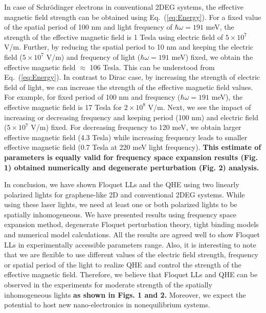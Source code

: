 In case of Schr\"{o}dinger electrons in conventional 2DEG systems, the effective magnetic field strength can be obtained using Eq.~(\ref{eq:Energy}).
For a fixed value of the spatial period of 100 nm and light frequency of $\hbar \omega = 191$ meV, the strength of the effective magnetic field is 1 Tesla using electric field of $5 \times 10^7$ V/m.
Further, by reducing the spatial period to 10 nm and keeping the electric field ($5 \times 10^7$ V/m) and frequency of light ($\hbar \omega = 191 $ meV) fixed, we obtain the effective magnetic field $\approx$ 106 Tesla.
This can be understood from Eq.~(\ref{eq:Energy}).
In contrast to Dirac case, by increasing the strength of electric field of light, we can increase the strength of the effective magnetic field values.
For example, for fixed period of 100 nm and frequency ($\hbar \omega = 191 $ meV), the effective magnetic field is 17 Tesla for $2 \times 10^8$ V/m.
Next, we see the impact of increasing or decreasing frequency and keeping period (100 nm) and electric field ($5 \times 10^7$ V/m) fixed.
For decreasing frequency to 120 meV, we obtain larger effective magnetic field (4.3 Tesla) while increasing frequency leads to smaller effective magnetic field (0.7 Tesla at 220 meV light frequency).
\textbf{This estimate of parameters is equally valid for frequency space expansion results (Fig. 1) obtained numerically and degenerate perturbation (Fig. 2) analysis.}

In conclusion, we have shown Floquet LLs and the QHE using two linearly polarized lights for graphene-like 2D and conventional 2DEG systems.
While using these laser lights, we  need at least one or both polarized lights to be spatially inhomogeneous.
We have presented results using frequency space expansion method, degenerate Floquet perturbation theory, tight binding models and numerical model calculations.
All the results are agreed well to show Floquet LLs in experimentally accessible parameters range.
Also, it is interesting to note that we are flexible to use different values of the electric field strength, frequency or spatial period of the light to realize QHE and control the strength of the effective magnetic field.
Therefore, we believe that Floquet LLs and QHE can be observed in the experiments for moderate strength of the spatially inhomogeneous lights \textbf{as shown in Figs. 1 and 2.} Moreover, we expect the potential to host new nano-electronics in nonequilibrium systems.

